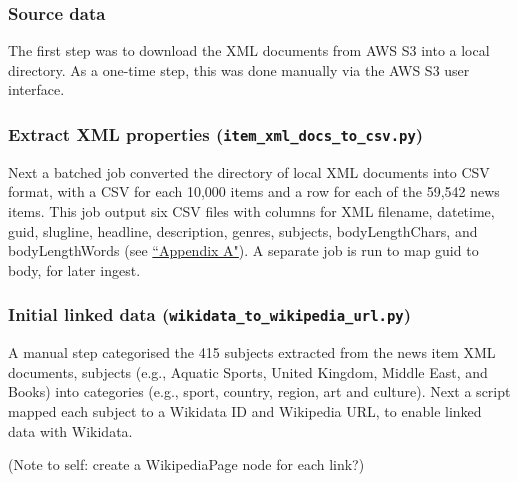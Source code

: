 \documentclass[11pt]{article}
\begin{document}
  \subsubsection{Source data}
  The first step was to download the XML documents from AWS S3 into a local directory. As a one-time step, this was done manually via the AWS S3 user interface.

  \subsubsection{Extract XML properties (\lstinline{item_xml_docs_to_csv.py})}
  Next a batched job converted the directory of local XML documents into CSV format, with a CSV for each 10,000 items and a row for each of the 59,542 news items. This job output six CSV files with columns for XML filename, datetime, guid, slugline, headline, description, genres, subjects, bodyLengthChars, and bodyLengthWords (see \hyperref[sec:AppendixA]{``Appendix A"}). A separate job is run to map guid to body, for later ingest.
  
  \subsubsection{Initial linked data (\lstinline{wikidata_to_wikipedia_url.py})}
  A manual step categorised the 415 subjects extracted from the news item XML documents, subjects (e.g., Aquatic Sports, United Kingdom, Middle East, and Books) into categories (e.g., sport, country, region, art and culture). Next a script mapped each subject to a Wikidata ID and Wikipedia URL, to enable linked data with Wikidata.

  (Note to self: create a WikipediaPage node for each link?)
  
\end{document}
